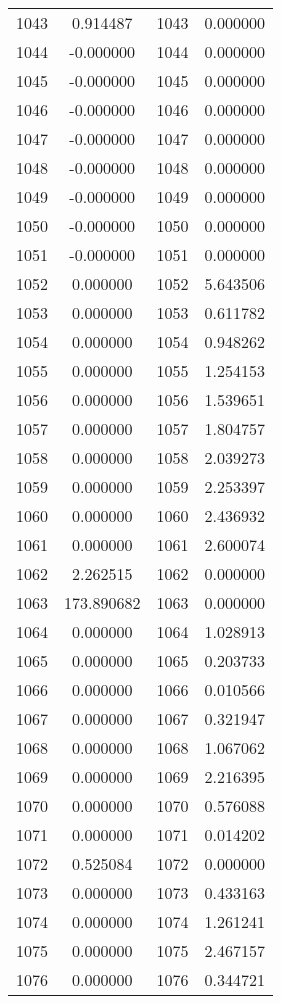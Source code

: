 \documentclass[12pt]{article}
\begin{document}
\begin{longtable}{@{}cccc@{}}
1043 & 0.914487 & 1043 & 0.000000 \\
1044 & -0.000000 & 1044 & 0.000000 \\
1045 & -0.000000 & 1045 & 0.000000 \\
1046 & -0.000000 & 1046 & 0.000000 \\
1047 & -0.000000 & 1047 & 0.000000 \\
1048 & -0.000000 & 1048 & 0.000000 \\
1049 & -0.000000 & 1049 & 0.000000 \\
1050 & -0.000000 & 1050 & 0.000000 \\
1051 & -0.000000 & 1051 & 0.000000 \\
1052 & 0.000000 & 1052 & 5.643506 \\
1053 & 0.000000 & 1053 & 0.611782 \\
1054 & 0.000000 & 1054 & 0.948262 \\
1055 & 0.000000 & 1055 & 1.254153 \\
1056 & 0.000000 & 1056 & 1.539651 \\
1057 & 0.000000 & 1057 & 1.804757 \\
1058 & 0.000000 & 1058 & 2.039273 \\
1059 & 0.000000 & 1059 & 2.253397 \\
1060 & 0.000000 & 1060 & 2.436932 \\
1061 & 0.000000 & 1061 & 2.600074 \\
1062 & 2.262515 & 1062 & 0.000000 \\
1063 & 173.890682 & 1063 & 0.000000 \\
1064 & 0.000000 & 1064 & 1.028913 \\
1065 & 0.000000 & 1065 & 0.203733 \\
1066 & 0.000000 & 1066 & 0.010566 \\
1067 & 0.000000 & 1067 & 0.321947 \\
1068 & 0.000000 & 1068 & 1.067062 \\
1069 & 0.000000 & 1069 & 2.216395 \\
1070 & 0.000000 & 1070 & 0.576088 \\
1071 & 0.000000 & 1071 & 0.014202 \\
1072 & 0.525084 & 1072 & 0.000000 \\
1073 & 0.000000 & 1073 & 0.433163 \\
1074 & 0.000000 & 1074 & 1.261241 \\
1075 & 0.000000 & 1075 & 2.467157 \\
1076 & 0.000000 & 1076 & 0.344721 \\

\end{longtable}
\end{document}
